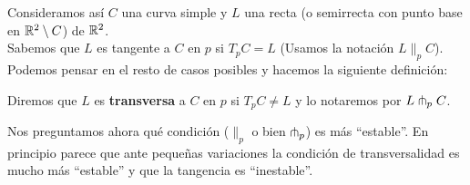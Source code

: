 Consideramos así $C$ una curva simple y $L$ una recta (o semirrecta con punto base en $\mathbb{R}^2 \setminus C$) de $\mathbb{R}^2$.\\

Sabemos que $L$ es tangente a $C$ en $p$ si $T_pC=L$ (Usamos la notación $L\|_p C$). Podemos pensar en el resto de casos posibles y hacemos la siguiente definición:

\begin{definicion}\label{def:transv_p}
    Diremos que $L$ es \textbf{transversa} a $C$ en $p$ si $T_pC \neq L$ y lo notaremos por $L\pitchfork_pC$.
\end{definicion}

Nos preguntamos ahora qué condición ($\|_p$ o bien $\pitchfork_p$) es más ``estable''. En principio parece que ante pequeñas variaciones la condición de transversalidad es mucho más ``estable'' y que la tangencia es ``inestable''.\\

